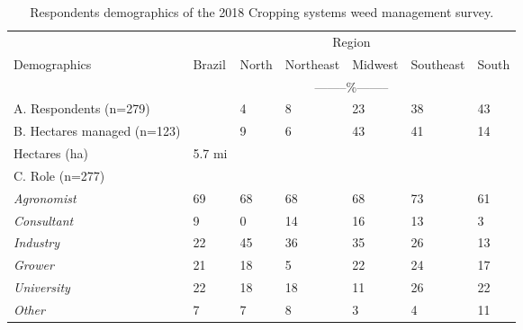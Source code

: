 \documentclass[
  12pt,
  a4paper]{article}
\begin{document}
\newpage

\begin{table}[ht!]
\centering
\caption{Respondents demographics of the 2018 Cropping systems weed management survey.}
\label{tab:my-table}
\begin{tabular}{@{}lllllll@{}}
\toprule
                            & \multicolumn{6}{c}{Region}                               \\ \cmidrule(l){2-7} 
Demographics                & Brazil & North & Northeast & Midwest & Southeast & South \\ \hline
                            & \multicolumn{6}{c}{--------\%--------}                           \\ 
A. Respondents (n=279)      &        & 4     & 8         & 23      & 38        & 43    \\
B. Hectares managed (n=123) &        & 9     & 6         & 43      & 41        & 14    \\
\hspace{6mm} Hectares (ha)       &   5.7 mi     &       &           &         &           &       \\
C. Role (n=277)             &        &       &           &         &           &       \\
\hspace{3mm}\textit{Agronomist}         & 69     & 68    & 68        & 68      & 73        & 61    \\
\hspace{3mm}\textit{Consultant}         & 9      & 0     & 14        & 16      & 13        & 3     \\
\hspace{3mm}\textit{Industry}           & 22     & 45    & 36        & 35      & 26        & 13    \\
\hspace{3mm}\textit{Grower}             & 21     & 18    & 5         & 22      & 24        & 17    \\
\hspace{3mm}\textit{University}         & 22     & 18    & 18        & 11      & 26        & 22    \\
\hspace{3mm}\textit{Other}              & 7      & 7     & 8         & 3       & 4         & 11    \\ \bottomrule
\end{tabular}
\end{table}

\newpage
\end{document}

